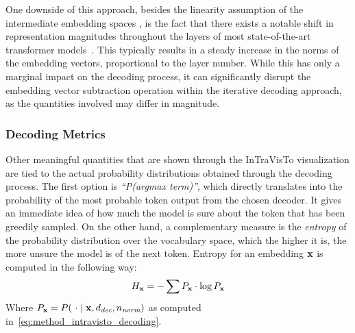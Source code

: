 One downside of this approach, besides the linearity assumption of the intermediate embedding spaces , is the fact that there exists a notable shift in representation magnitudes throughout the layers of most state-of-the-art transformer models~\cite{heimersheim2023}.
This typically results in a steady increase in the norms of the embedding vectors, proportional to the layer number.
While this has only a marginal impact on the decoding process, it can significantly disrupt the embedding vector subtraction operation within the iterative decoding approach, as the quantities involved may differ in magnitude.

\subsubsection{Decoding Metrics}\label{sssec:method_intravisto_decoding_metrics}

Other meaningful quantities that are shown through the InTraVisTo visualization are tied to the actual probability distributions obtained through the decoding process.
The first option is \emph{``P(argmax term)''}, which directly translates into the probability of the most probable token output from the chosen decoder.
It gives an immediate idea of how much the model is sure about the token that has been greedily sampled.
On the other hand, a complementary measure is the \emph{entropy} of the probability distribution over the vocabulary space, which the higher it is, the more unsure the model is of the next token.
Entropy for an embedding $\bm{\mathbf{x}}$ is computed in the following way:
\begin{equation*}
    \label{eq:method_intravisto_entropy}
    H_{\bm{\mathbf{x}}} = -\sum{P_{\bm{\mathbf{x}}} \cdot \log{P_{\bm{\mathbf{x}}}}}
\end{equation*}
Where $P_{\bm{\mathbf{x}}} = P(\ \cdot \mid \bm{\mathbf{x}}, d_\textit{dec}, n_\textit{norm})$ as computed in~\cref{eq:method_intravisto_decoding}.

